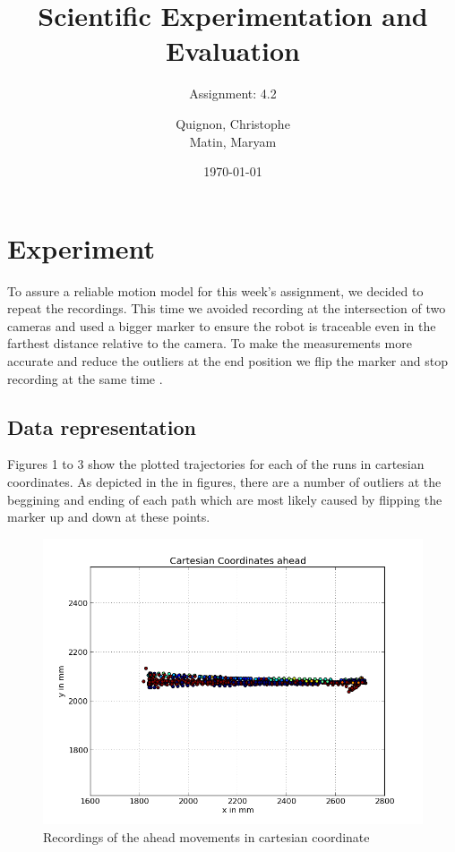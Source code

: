\documentclass{scrartcl}
\begin{document}
\title{Scientific Experimentation and Evaluation
}
\subtitle{
Assignment: 4.2}
\author{
  Quignon, Christophe\\
  Matin, Maryam
}
\date{\today}


\maketitle


\section{Experiment}
To assure a reliable motion model for this week's assignment, we decided to repeat the recordings. This time we avoided recording at the intersection of two cameras and used a bigger marker to ensure the robot is traceable even in the farthest distance relative to the camera. To make the measurements more accurate and reduce the outliers at the end position we flip the marker and stop recording at the same time .  



\subsection{Data representation}
Figures 1 to 3 show the plotted trajectories for each of the runs in cartesian coordinates. As depicted in the in figures, there are a number of outliers at the beggining and ending of each path which are most likely caused by flipping the marker up and down at these points.


\begin{figure}[H]
\centering
\begin{minipage}{.5\textwidth}
  \centering
  \includegraphics[width=1\linewidth]{img_second_run/Cartesian_ahead.png}
\end{minipage}%

\caption{Recordings of the ahead movements in cartesian coordinate}
\label{fig:outliers}
\end{figure}
\end{document}
